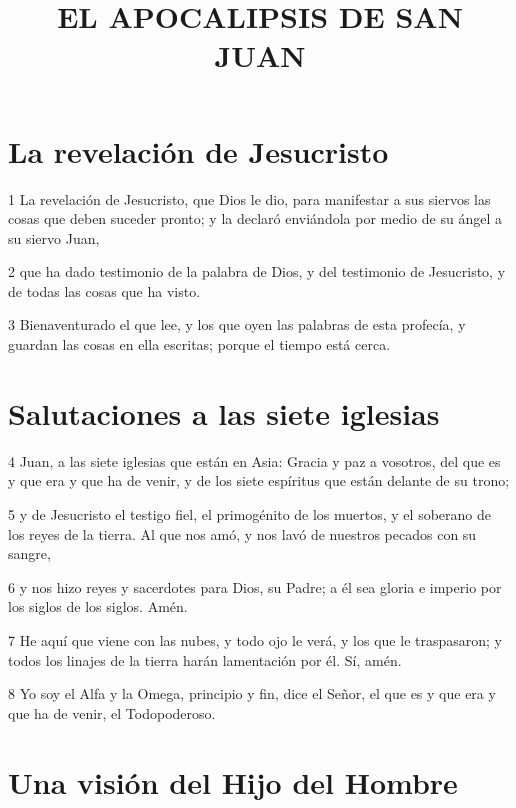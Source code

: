 
\title{EL APOCALIPSIS DE SAN JUAN}

\section*{La revelación de Jesucristo}

\par 1 La revelación de Jesucristo, que Dios le dio, para manifestar a sus siervos las cosas que deben suceder pronto; y la declaró enviándola por medio de su ángel a su siervo Juan,
\par 2 que ha dado testimonio de la palabra de Dios, y del testimonio de Jesucristo, y de todas las cosas que ha visto.
\par 3 Bienaventurado el que lee, y los que oyen las palabras de esta profecía, y guardan las cosas en ella escritas; porque el tiempo está cerca.

\section*{Salutaciones a las siete iglesias}

\par 4 Juan, a las siete iglesias que están en Asia: Gracia y paz a vosotros, del que es y que era y que ha de venir, y de los siete espíritus que están delante de su trono;
\par 5 y de Jesucristo el testigo fiel, el primogénito de los muertos, y el soberano de los reyes de la tierra. Al que nos amó, y nos lavó de nuestros pecados con su sangre,
\par 6 y nos hizo reyes y sacerdotes para Dios, su Padre; a él sea gloria e imperio por los siglos de los siglos. Amén.
\par 7 He aquí que viene con las nubes, y todo ojo le verá, y los que le traspasaron; y todos los linajes de la tierra harán lamentación por él. Sí, amén.
\par 8 Yo soy el Alfa y la Omega, principio y fin, dice el Señor, el que es y que era y que ha de venir, el Todopoderoso.

\section*{Una visión del Hijo del Hombre}

